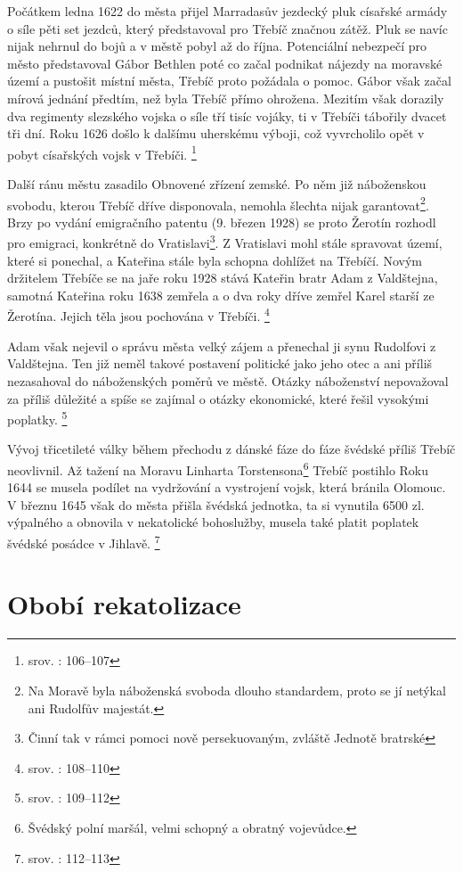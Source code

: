 \documentclass[a4paper,oneside,12p]{report}
\begin{document}
Počátkem ledna 1622 do města přijel Marradasův jezdecký pluk císařské armády o síle pěti set jezdců, který představoval pro Třebíč značnou zátěž.
Pluk se navíc nijak nehrnul do bojů a v městě pobyl až do října.
Potenciální nebezpečí pro město představoval Gábor Bethlen poté co začal podnikat nájezdy na moravské území a pustošit místní města, Třebíč proto požádala o pomoc.
Gábor však začal mírová jednání předtím, než byla Třebíč přímo ohrožena.
Mezitím však dorazily dva regimenty slezského vojska o síle tří tisíc vojáky, ti v Třebíči tábořily dvacet tři dní.
Roku 1626 došlo k dalšímu uherskému výboji, což vyvrcholilo opět v pobyt císařských vojsk v Třebíči. \footnote{srov. \cite{Uhlir1978}: 106--107}

Další ránu městu zasadilo Obnovené zřízení zemské.
Po něm již náboženskou svobodu, kterou Třebíč dříve disponovala,  nemohla šlechta nijak garantovat\footnote{Na Moravě byla náboženská svoboda dlouho standardem, proto se jí netýkal ani Rudolfův majestát.}.
Brzy po vydání emigračního patentu (9. březen 1928) se proto Žerotín rozhodl pro emigraci, konkrétně do Vratislavi\footnote{Činní tak v rámci pomoci nově persekuovaným, zvláště Jednotě bratrské}.
Z Vratislavi mohl stále spravovat území, které si ponechal, a Kateřina stále byla schopna dohlížet na Třebíčí.
Novým držitelem Třebíče se na jaře roku 1928 stává Kateřin bratr Adam z Valdštejna, samotná Kateřina roku 1638 zemřela a o dva roky dříve zemřel Karel starší ze Žerotína. %
Jejich těla jsou pochována v Třebíči. \footnote{srov. \cite{Uhlir1978}: 108--110}

Adam však nejevil o správu města velký zájem a přenechal ji synu Rudolfovi z Valdštejna.
Ten již neměl takové postavení politické jako jeho otec a ani příliš nezasahoval do náboženských poměrů ve městě.
Otázky náboženství nepovažoval za příliš důležité a spíše se zajímal o otázky ekonomické, které řešil vysokými poplatky. \footnote{srov. \cite{Uhlir1978}: 109--112}

Vývoj třicetileté války během přechodu z dánské fáze do fáze švédské příliš Třebíč neovlivnil.
Až tažení na Moravu Linharta Torstensona\footnote{Švédský polní maršál, velmi schopný a obratný vojevůdce.} Třebíč postihlo
Roku 1644 se musela podílet na vydržování a vystrojení vojsk, která bránila Olomouc.
V březnu 1645 však do města přišla švédská jednotka, ta si vynutila 6500 zl. výpalného a obnovila v nekatolické bohoslužby, musela také platit poplatek švédské posádce v Jihlavě. \footnote{srov. \cite{Uhlir1978}: 112--113}

\section{Obobí rekatolizace}
\end{document}

